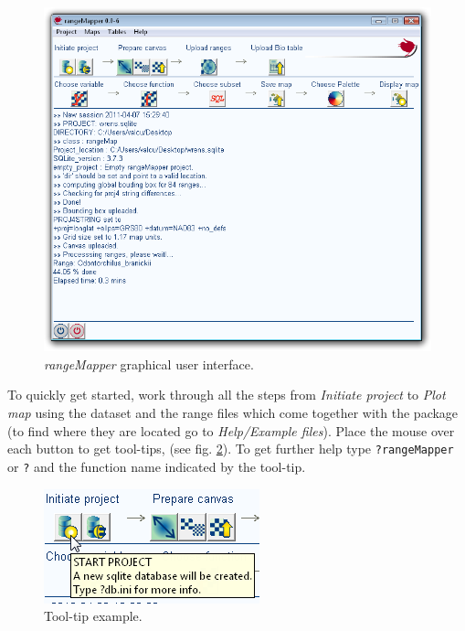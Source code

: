 \documentclass[ a4paper ]{article}
\begin{document}
\begin{figure}[htbp]
  \begin{center}
	\includegraphics[width=1\linewidth]{fig1}
    \caption{\label{fig:fig1} \emph{rangeMapper} graphical user interface.}
  \end{center}
\end{figure}

To quickly get started, work through all the steps from \textit{Initiate project} to  \textit{Plot map} using the dataset and the range files which come together with the package (to find where they are located go to  \textit{ Help/Example files}). Place the mouse over each button to get tool-tips, (see fig. \ref{fig:fig2}). To get further help type  \texttt{?rangeMapper}  or \texttt{?} and the function name indicated by the tool-tip. 

	\begin{figure}[htbp]
	  \begin{center}
		\includegraphics[width=0.5\linewidth]{fig2}
		\caption{\label{fig:fig2} Tool-tip example.}
	  \end{center}
	\end{figure}
	
\end{document}
